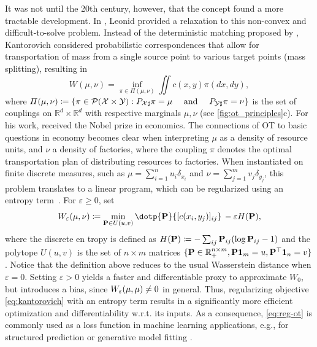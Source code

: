 It was not until the 20th century, however, that the concept found a more tractable development. In \citeyear{kantorovich1942transfer}, Leonid \citeauthor{kantorovich1942transfer} provided a relaxation to this non-convex and difficult-to-solve problem.
Instead of the deterministic matching proposed by \citeauthor{monge1781histoire}, Kantorovich considered probabilistic correspondences that allow for transportation of mass from a single source point to various target points (mass splitting), resulting in
\begin{equation} \label{eq:kantorovich}
    W(\mu, \nu) = \inf_{\pi\in \Pi(\mu,\nu)}\iint c(x, y) \pi(dx, dy),
\end{equation}
where $\Pi(\mu, \nu) \coloneqq \left\{\pi \in {\mathcal{P}}(\mathcal{X} \times \mathcal{Y}): P_{{\mathcal{X}} \sharp} \pi=\mu \quad \text { and } \quad P_{{\mathcal{Y}} \sharp} \pi=\nu\right\}$ is the set of couplings on $\mathbb{R}^d\times\mathbb{R}^d$ with respective marginals $\mu, \nu$ (see \cref{fig:ot_principles}c).
For his work, \citeauthor{kantorovich1942transfer} received the Nobel prize in economics. The connections of \acrshort{OT} to basic questions in economy becomes clear when interpreting $\mu$ as a density of resource units, and $\nu$ a density of factories, where the coupling $\pi$ denotes the optimal transportation plan of distributing resources to factories.
When instantiated on finite discrete measures, such as $\mu=\sum_{i=1}^n u_i\delta_{x_i}$ and $\nu=\sum_{j=1}^m v_j\delta_{y_j}$, this problem translates to a linear program, which can be regularized using an entropy term~\citep{cuturi2013sinkhorn,peyre2019computational}. For $\varepsilon\geq0$, set 
\begin{equation} \label{eq:reg-ot}
\We(\mu,\nu) \defeq \min_{\bP\in U(u, v)} \dotp{\bP}{[c(x_i, y_j)]_{ij}}  \,-\varepsilon H(\bP),
\end{equation}
where the discrete en    tropy is defined as $H(\mathbf{P}) \coloneqq -\sum_{ij} \mathbf{P}_{ij} (\log \mathbf{P}_{ij} - 1)$ and the polytope $U(u, v)$ is the set of $n\times m$ matrices $\{\mathbf{P}\in\mathbb{R}^{n \times m}_+, \mathbf{P}\mathbf{1}_m =u, \mathbf{P}^\top\mathbf{1}_n=v\}$. 
Notice that the definition above reduces to the usual Wasserstein distance when $\varepsilon=0$. Setting $\varepsilon>0$ yields a faster and differentiable proxy to approximate $W_{0}$, but introduces a bias, since $W_{\varepsilon}(\mu,\mu)\ne 0$ in general.
Thus, regularizing objective \eqref{eq:kantorovich} with an entropy term results in a significantly more efficient optimization \citep{cuturi2013sinkhorn} and differentiability w.r.t. its inputs. As a consequence, \eqref{eq:reg-ot} is commonly used as a loss function in machine learning applications, e.g., for structured prediction \citep{frogner2015learning,janati2020multi} or generative model fitting \citep{arjovsky2017wasserstein, salimans2018improving, genevay2018learning}.


